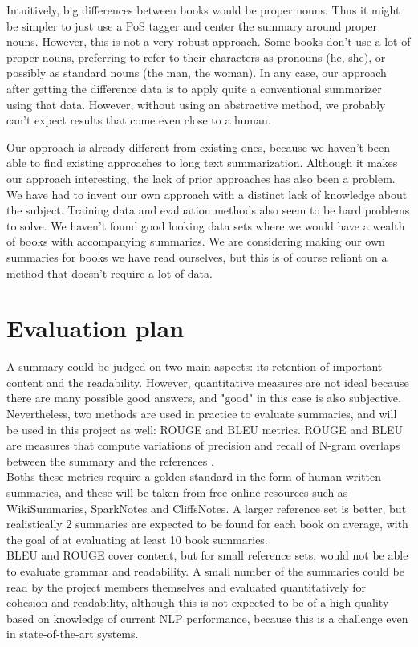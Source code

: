 Intuitively, big differences between books would be proper nouns. Thus it might
be simpler to just use a PoS tagger and center the summary around proper nouns.
However, this is not a very robust approach. Some books don't use a lot of
proper nouns, preferring to refer to their characters as pronouns (he, she), or
possibly as standard nouns (the man, the woman).  In any case, our approach
after getting the difference data is to apply quite a conventional summarizer
using that data. However, without using an abstractive method, we probably
can't expect results that come even close to a human.

Our approach is already different from existing ones, because we haven't been
able to find existing approaches to long text summarization.  Although it makes
our approach interesting, the lack of prior approaches has also been a problem.
We have had to invent our own approach with a distinct lack of knowledge about
the subject. Training data and evaluation methods also seem to be hard problems
to solve. We haven't found good looking data sets where we would have a wealth
of books with accompanying summaries. We are considering making our own
summaries for books we have read ourselves, but this is of course reliant on a
method that doesn't require a lot of data.


\section{Evaluation plan}
A summary could be judged on two main aspects: its retention of important content and the readability. However, quantitative measures are not ideal because there are many possible good answers, and "good" in this case is also subjective. Nevertheless, two methods are used in practice to evaluate summaries, and will be used in this project as well: ROUGE and BLEU metrics. ROUGE and BLEU are measures that compute variations of precision and recall of N-gram overlaps between the summary and the references \cite{nenkova2006summarization} \cite{lin2004rouge}. \\
Boths these metrics require a golden standard in the form of human-written summaries, and these will be taken from free online resources such as WikiSummaries, SparkNotes and CliffsNotes. A larger reference set is better, but realistically 2 summaries are expected to be found for each book on average, with the goal of at evaluating at least 10 book summaries. \\
BLEU and ROUGE cover content, but for small reference sets, would not be able to evaluate grammar and readability. A small number of the summaries could be read by the project members themselves and evaluated quantitatively for cohesion and readability, although this is not expected to be of a high quality based on knowledge of current NLP performance, because this is a challenge even in state-of-the-art systems.

